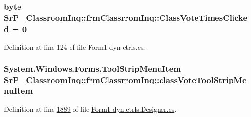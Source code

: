 \hypertarget{class_sr_p___classroom_inq_1_1frm_classrrom_inq_ab63c943c019363dba6aa86686b9f2bf6}{
\subsubsection[{\-Class\-Vote\-Times\-Clicked}]{\setlength{\rightskip}{0pt plus 5cm}byte {\bf \-Sr\-P\-\_\-\-Classroom\-Inq\-::frm\-Classrrom\-Inq\-::\-Class\-Vote\-Times\-Clicked} = 0}}
\label{class_sr_p___classroom_inq_1_1frm_classrrom_inq_ab63c943c019363dba6aa86686b9f2bf6}


\-Definition at line \hyperlink{_form1-dyn-ctrls_8cs_source_l00124}{124} of file \hyperlink{_form1-dyn-ctrls_8cs_source}{\-Form1-\/dyn-\/ctrls.\-cs}.

\hypertarget{class_sr_p___classroom_inq_1_1frm_classrrom_inq_add88d2c77e31773b18b9a6b571f3207f}{
\subsubsection[{class\-Vote\-Tool\-Strip\-Menu\-Item}]{\setlength{\rightskip}{0pt plus 5cm}\-System.\-Windows.\-Forms.\-Tool\-Strip\-Menu\-Item {\bf \-Sr\-P\-\_\-\-Classroom\-Inq\-::frm\-Classrrom\-Inq\-::class\-Vote\-Tool\-Strip\-Menu\-Item}}}
\label{class_sr_p___classroom_inq_1_1frm_classrrom_inq_add88d2c77e31773b18b9a6b571f3207f}


\-Definition at line \hyperlink{_form1-dyn-ctrls_8_designer_8cs_source_l01889}{1889} of file \hyperlink{_form1-dyn-ctrls_8_designer_8cs_source}{\-Form1-\/dyn-\/ctrls.\-Designer.\-cs}.

